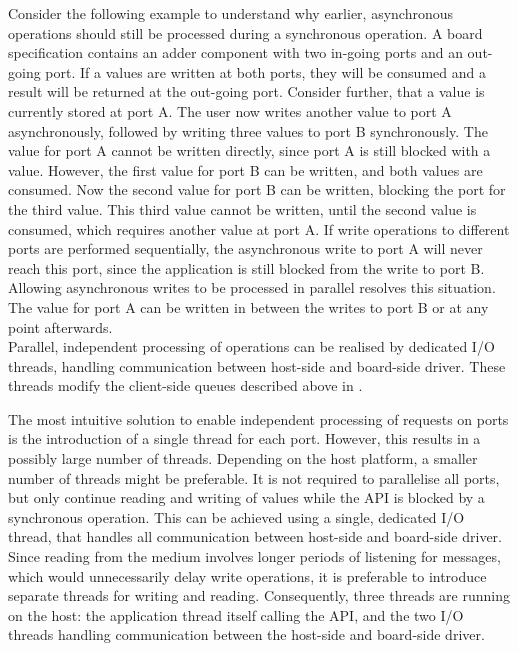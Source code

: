 \documentclass{report}
\begin{document}
Consider the following example to understand why earlier, asynchronous operations should still be processed during a synchronous operation. A board specification contains an adder component with two in-going ports and an out-going port. If a values are written at both ports, they will be consumed and a result will be returned at the out-going port. Consider further, that a value is currently stored at port A. The user now writes another value to port A asynchronously, followed by writing three values to port B synchronously. The value for port A cannot be written directly, since port A is still blocked with a value. However, the first value for port B can be written, and both values are consumed. Now the second value for port B can be written, blocking the port for the third value. This third value cannot be written, until the second value is consumed, which requires another value at port A. If write operations to different ports are performed sequentially, the asynchronous write to port A will never reach this port, since the application is still blocked from the write to port B. Allowing asynchronous writes to be processed in parallel resolves this situation. The value for port A can be written in between the writes to port B or at any point afterwards.\\

Parallel, independent processing of operations can be realised by dedicated I/O threads, handling communication between host-side and board-side driver. These threads modify the client-side queues described above in .

The most intuitive solution to enable independent processing of requests on ports is the introduction of a single thread for each port. However, this results in a possibly large number of threads. Depending on the host platform, a smaller number of threads might be preferable. It is not required to parallelise all ports, but only continue reading and writing of values while the API is blocked by a synchronous operation. This can be achieved using a single, dedicated I/O thread, that handles all communication between host-side and board-side driver. Since reading from the medium involves longer periods of listening for messages, which would unnecessarily delay write operations, it is preferable to introduce separate threads for writing and reading. Consequently, three threads are running on the host: the application thread itself calling the API, and the two I/O threads handling communication between the host-side and board-side driver.
\end{document}

